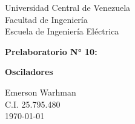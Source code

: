 \begin{titlepage}
    \centering
    \Large
    Universidad Central de Venezuela\\
    Facultad de Ingeniería\\
    Escuela de Ingeniería Eléctrica
    \vspace*{8cm}

    \Huge
    \textbf{Prelaboratorio N° 10: } 

    \textbf{Osciladores}
    \vfill


    \Large

    Emerson Warhman \\
    C.I. 25.795.480 \\
    \today

\end{titlepage}